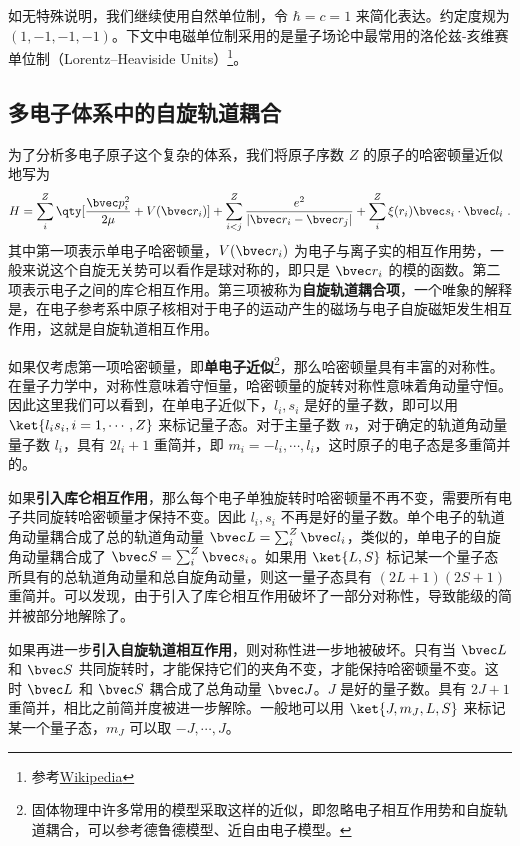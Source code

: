 

如无特殊说明，我们继续使用自然单位制，令 $\hbar=c=1$ 来简化表达。约定度规为 $(1,-1,-1,-1)$。下文中电磁单位制采用的是量子场论中最常用的洛伦兹-亥维赛单位制（Lorentz–Heaviside Units）\footnote{参考\href{https://en.wikipedia.org/wiki/Heaviside\%E2\%80\%93Lorentz_units}{Wikipedia}}。


\subsection{多电子体系中的自旋轨道耦合}
\cite{黄昆}为了分析多电子原子这个复杂的体系，我们将原子序数 $Z$ 的原子的哈密顿量近似地写为
\begin{equation}
H=\sum_{i}^{Z} \qty[\frac{\bvec p_i^2}{2\mu} +V(\bvec r_i)]+\sum_{i<j}^Z \frac{e^2}{|\bvec r_i-\bvec r_j|}+\sum_i^Z \xi(r_i)\bvec s_i\cdot \bvec l_i~.
\end{equation}
其中第一项表示单电子哈密顿量，$V(\bvec r_i)$ 为电子与离子实的相互作用势，一般来说这个自旋无关势可以看作是球对称的，即只是 $\bvec r_i$ 的模的函数。第二项表示电子之间的库仑相互作用。第三项被称为\textbf{自旋轨道耦合项}，一个唯象的解释是，在电子参考系中原子核相对于电子的运动产生的磁场与电子自旋磁矩发生相互作用，这就是自旋轨道相互作用。

如果仅考虑第一项哈密顿量，即\textbf{单电子近似}\footnote{固体物理中许多常用的模型采取这样的近似，即忽略电子相互作用势和自旋轨道耦合，可以参考德鲁德模型、近自由电子模型。}，那么哈密顿量具有丰富的对称性。在量子力学中，对称性意味着守恒量，哈密顿量的旋转对称性意味着角动量守恒。因此这里我们可以看到，在单电子近似下，$l_i,s_i$ 是好的量子数，即可以用 $\ket{l_is_i,i=1,\cdots,Z}$ 来标记量子态。对于主量子数 $n$，对于确定的轨道角动量量子数 $l_i$，具有 $2 l_i+1$ 重简并，即 $m_{i}=-l_i,\cdots,l_i$，这时原子的电子态是多重简并的。

如果\textbf{引入库仑相互作用}，那么每个电子单独旋转时哈密顿量不再不变，需要所有电子共同旋转哈密顿量才保持不变。因此 $l_i,s_i$ 不再是好的量子数。单个电子的轨道角动量耦合成了总的轨道角动量 $\bvec L=\sum_i^Z \bvec l_i$，类似的，单电子的自旋角动量耦合成了 $\bvec S=\sum_i^Z \bvec s_i$。如果用 $\ket{L,S}$ 标记某一个量子态所具有的总轨道角动量和总自旋角动量，则这一量子态具有 $(2L+1)(2S+1)$ 重简并。可以发现，由于引入了库仑相互作用破坏了一部分对称性，导致能级的简并被部分地解除了。

如果再进一步\textbf{引入自旋轨道相互作用}，则对称性进一步地被破坏。只有当 $\bvec L$ 和 $\bvec S$ 共同旋转时，才能保持它们的夹角不变，才能保持哈密顿量不变。这时 $\bvec L$ 和 $\bvec S$ 耦合成了总角动量 $\bvec J$。$J$ 是好的量子数。具有 $2J+1$ 重简并，相比之前简并度被进一步解除。一般地可以用 $\ket{J,m_J,L,S}$ 来标记某一个量子态，$m_J$ 可以取 $-J,\cdots,J$。
